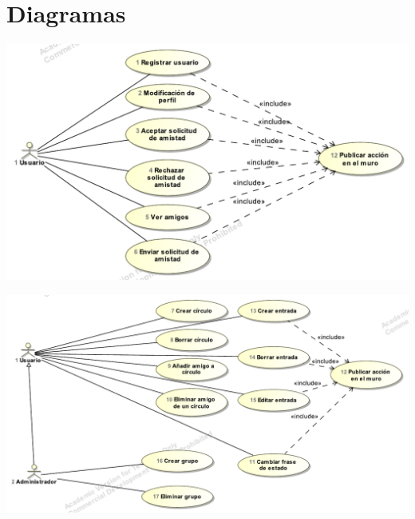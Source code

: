 \documentclass[12pt, a4paper, titlepage]{article}
\begin{document}
\section{Diagramas}
\begin{center}

\includegraphics[width=\textwidth]{Imagenes/casosUso1}
\end{center}

\begin{center}
\includegraphics[width=\textwidth]{Imagenes/casosUso2}
\end{center}
\end{document}
